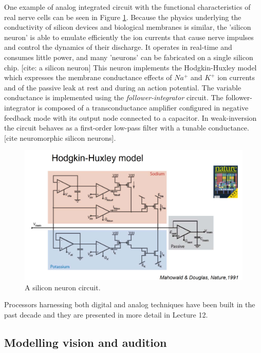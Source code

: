 \documentclass[main]{subfiles}
\begin{document}
One example of analog integrated circuit with the functional characteristics of real nerve cells can be seen in Figure \ref{fig:hh}. Because the physics underlying the conductivity of silicon devices and biological membranes is similar, the 'silicon neuron' is able to emulate efficiently the ion currents that cause nerve impulses and control the dynamics of their discharge. It operates in real-time and consumes little power, and many 'neurons' can be fabricated on a single silicon chip.  [cite: a silicon neuron] This neuron implements the Hodgkin-Huxley model which expresses the membrane conductance effects of $Na^+$ and $K^+$ ion currents and of the passive leak at rest and during an action potential. The variable conductance is implemented using the \textit{follower-integrator} circuit. The follower-integrator is composed of a transconductance amplifier configured in negative feedback mode with its output node connected to a capacitor. In weak-inversion the circuit behaves as a first-order low-pass filter with a tunable conductance. [cite neuromorphic silicon neurons].
%
\begin{figure}[h]
    \centering
    \includegraphics[width=0.8\linewidth]{11_NeuromorphicSystems1/figures/hh_model.png}
    \caption{A silicon neuron circuit.}
    \label{fig:hh}
\end{figure}
%

Processors harnessing both digital and analog techniques have been built in the past decade and they are presented in more detail in Lecture 12.

\subsection{Modelling vision and audition}
\end{document}
